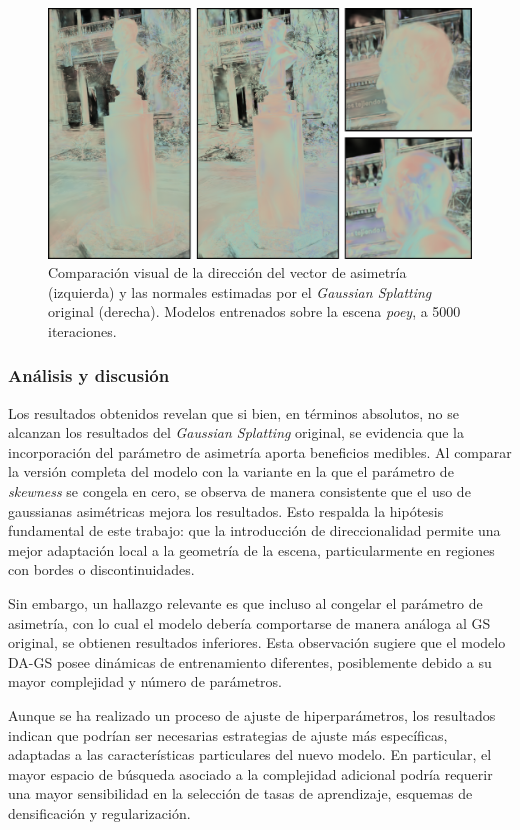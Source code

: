 \begin{figure}[htbp]
\centering
\includegraphics[width=1.0\textwidth]{Graphics/normals.png}
\caption{Comparación visual de la dirección del vector de asimetría (izquierda) y las normales estimadas por el \textit{Gaussian Splatting} original (derecha). Modelos entrenados sobre la escena \textit{poey}, a 5000 iteraciones.}
\label{fig:normals}
\end{figure}

\subsubsection{Análisis y discusión}


Los resultados obtenidos revelan que si bien, en términos absolutos, no se alcanzan los resultados del \textit{Gaussian Splatting} original, se evidencia que la incorporación del parámetro de asimetría aporta beneficios medibles. Al comparar la versión completa del modelo con la variante en la que el parámetro de \textit{skewness} se congela en cero, se observa de manera consistente que el uso de gaussianas asimétricas mejora los resultados. Esto respalda la hipótesis fundamental de este trabajo: que la introducción de direccionalidad permite una mejor adaptación local a la geometría de la escena, particularmente en regiones con bordes o discontinuidades.

Sin embargo, un hallazgo relevante es que incluso al congelar el parámetro de asimetría, con lo cual el modelo debería comportarse de manera análoga al GS original, se obtienen resultados inferiores. Esta observación sugiere que el modelo DA-GS posee dinámicas de entrenamiento diferentes, posiblemente debido a su mayor complejidad y número de parámetros.

Aunque se ha realizado un proceso de ajuste de hiperparámetros, los resultados indican que podrían ser necesarias estrategias de ajuste más específicas, adaptadas a las características particulares del nuevo modelo. En particular, el mayor espacio de búsqueda asociado a la complejidad adicional podría requerir una mayor sensibilidad en la selección de tasas de aprendizaje, esquemas de densificación y regularización.

